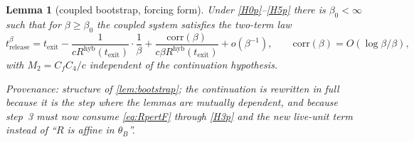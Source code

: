 \documentclass[11pt]{article}
\newtheorem{lemma}[lemma]{Lemma}
\theoremstyle{definition}
\theoremstyle{remark}
\newcommand{\texit}{t_{\mathrm{exit}}}
\newcommand{\hyb}{\mathrm{hyb}}
\begin{document}
\begin{lemma}[coupled bootstrap, forcing form]\label{lem:bootstrapF}
Under \textup{\eqref{H0p}--\eqref{H5p}} there is $\beta_0<\infty$ such that for
$\beta\ge\beta_0$ the coupled system satisfies the two-term law
\begin{equation}\label{eq:twotermF}
t^\beta_{\mathrm{release}}
=\texit-\frac{1}{cR^{\hyb}(\texit)}\cdot\frac1\beta
+\frac{\mathrm{corr}(\beta)}{c\beta R^{\hyb}(\texit)}+o(\beta^{-1}),
\qquad \mathrm{corr}(\beta)=O(\log\beta/\beta),
\end{equation}
with $M_2=C_fC_4/c$ independent of the continuation hypothesis.
\end{lemma}

\noindent\emph{Provenance: structure of \cref{lem:bootstrap}; the continuation
is rewritten in full because it is the step where the lemmas are mutually
dependent, and because step~3 must now consume \eqref{eq:RpertF} through
\eqref{H3p} and the new live-unit term instead of ``$R$ is affine in $\theta_B$''.}
\end{document}
